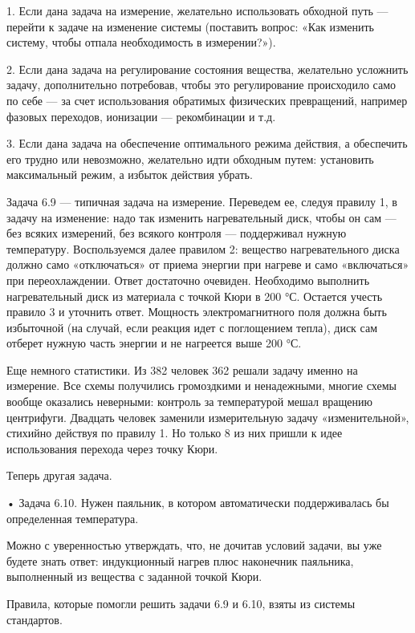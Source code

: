 1.  Если дана  задача на  измерение, желательно  использовать обходной
путь — перейти  к задаче на изменение системы  (поставить вопрос: «Как
изменить систему, чтобы отпала необходимость в измерении?»).

2. Если  дана задача  на регулирование состояния  вещества, желательно
усложнить  задачу, дополнительно  потребовав, чтобы  это регулирование
происходило само по себе —  за счет использования обратимых физических
превращений, например  фазовых переходов,  ионизации —  рекомбинации и
т.д.

3. Если  дана задача  на обеспечение  оптимального режима  действия, а
обеспечить его трудно или  невозможно, желательно идти обходным путем:
установить максимальный режим, а избыток действия убрать.

Задача  6.9  — типичная  задача  на  измерение. Переведем  ее,  следуя
правилу 1,  в задачу  на изменение:  надо так  изменить нагревательный
диск,  чтобы он  сам  —  без всяких  измерений,  без всякого  контроля
—  поддерживал нужную  температуру.  Воспользуемся  далее правилом  2:
вещество  нагревательного диска  должно само  «отключаться» от  приема
энергии  при нагреве  и  само «включаться»  при переохлаждении.  Ответ
достаточно  очевиден.  Необходимо  выполнить  нагревательный  диск  из
материала с точкой Кюри в 200 °С. Остается учесть правило 3 и уточнить
ответ.  Мощность электромагнитного  поля  должна  быть избыточной  (на
случай,  если реакция  идет  с поглощением  тепла),  диск сам  отберет
нужную часть энергии и не нагреется выше 200 °С.

Еще немного  статистики. Из  382 человек 362  решали задачу  именно на
измерение.  Все схемы  получились  громоздкими  и ненадежными,  многие
схемы  вообще  оказались  неверными: контроль  за  температурой  мешал
вращению  центрифуги. Двадцать  человек заменили  измерительную задачу
«изменительной», стихийно  действуя по правилу  1. Но только 8  из них
пришли к идее использования перехода через точку Кюри.

Теперь другая задача.


• Задача 6.10. Нужен  паяльник, в котором автоматически поддерживалась
бы определенная температура.

Можно с  уверенностью утверждать, что,  не дочитав условий  задачи, вы
уже будете знать ответ: индукционный нагрев плюс наконечник паяльника,
выполненный из вещества с заданной точкой Кюри.

Правила, которые  помогли решить задачи  6.9 и 6.10, взяты  из системы
стандартов.

